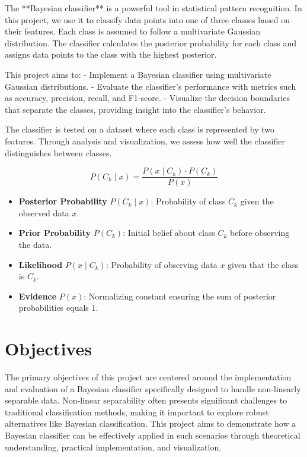 \documentclass[conference]{IEEEtran}
\begin{document}
	The **Bayesian classifier** is a powerful tool in statistical pattern recognition. In this project, we use it to classify data points into one of three classes based on their features. Each class is assumed to follow a multivariate Gaussian distribution. The classifier calculates the posterior probability for each class and assigns data points to the class with the highest posterior.
	
	This project aims to:
	- Implement a Bayesian classifier using multivariate Gaussian distributions.
	- Evaluate the classifier's performance with metrics such as accuracy, precision, recall, and F1-score.
	- Visualize the decision boundaries that separate the classes, providing insight into the classifier's behavior.
	
	The classifier is tested on a dataset where each class is represented by two features. Through analysis and visualization, we assess how well the classifier distinguishes between classes.
	
	\[
	P(C_k \mid x) = \frac{P(x \mid C_k) \cdot P(C_k)}{P(x)}
	\]
	
	\begin{itemize}
		\item \textbf{Posterior Probability} \( P(C_k \mid x) \): Probability of class \( C_k \) given the observed data \( x \).
		\item \textbf{Prior Probability} \( P(C_k) \): Initial belief about class \( C_k \) before observing the data.
		\item \textbf{Likelihood} \( P(x \mid C_k) \): Probability of observing data \( x \) given that the class is \( C_k \).
		\item \textbf{Evidence} \( P(x) \): Normalizing constant ensuring the sum of posterior probabilities equals 1.
	\end{itemize}
	
	\section{Objectives}
	
	The primary objectives of this project are centered around the implementation and evaluation of a Bayesian classifier specifically designed to handle non-linearly separable data. Non-linear separability often presents significant challenges to traditional classification methods, making it important to explore robust alternatives like Bayesian classification. This project aims to demonstrate how a Bayesian classifier can be effectively applied in such scenarios through theoretical understanding, practical implementation, and visualization.
	
\end{document}
